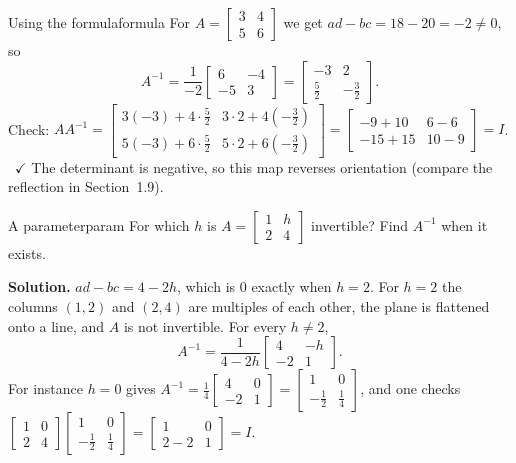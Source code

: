\documentclass[11pt]{article}
\begin{document}
\begin{exmp}{Using the formula}{formula}
For $A=\begin{bmatrix}3&4\\5&6\end{bmatrix}$ we get $ad-bc=18-20=-2\neq0$, so
\[
A^{-1}=\frac1{-2}\begin{bmatrix}6&-4\\-5&3\end{bmatrix}=\begin{bmatrix}-3&2\\\tfrac52&-\tfrac32\end{bmatrix}.
\]
Check: $AA^{-1}=\begin{bmatrix}3(-3)+4\cdot\tfrac52&3\cdot2+4(-\tfrac32)\\5(-3)+6\cdot\tfrac52&5\cdot2+6(-\tfrac32)\end{bmatrix}=\begin{bmatrix}-9+10&6-6\\-15+15&10-9\end{bmatrix}=I$. \ $\checkmark$ The determinant is negative, so this map reverses orientation (compare the reflection in Section~1.9).
\end{exmp}

\begin{exmp}{A parameter}{param}
For which $h$ is $A=\begin{bmatrix}1&h\\2&4\end{bmatrix}$ invertible? Find $A^{-1}$ when it exists.

\textbf{Solution.} $ad-bc=4-2h$, which is $0$ exactly when $h=2$. For $h=2$ the columns $(1,2)$ and $(2,4)$ are multiples of each other, the plane is flattened onto a line, and $A$ is not invertible. For every $h\neq2$,
\[
A^{-1}=\frac1{4-2h}\begin{bmatrix}4&-h\\-2&1\end{bmatrix}.
\]
For instance $h=0$ gives $A^{-1}=\tfrac14\begin{bmatrix}4&0\\-2&1\end{bmatrix}=\begin{bmatrix}1&0\\-\tfrac12&\tfrac14\end{bmatrix}$, and one checks $\begin{bmatrix}1&0\\2&4\end{bmatrix}\begin{bmatrix}1&0\\-\tfrac12&\tfrac14\end{bmatrix}=\begin{bmatrix}1&0\\2-2&1\end{bmatrix}=I$.
\end{exmp}
\end{document}
